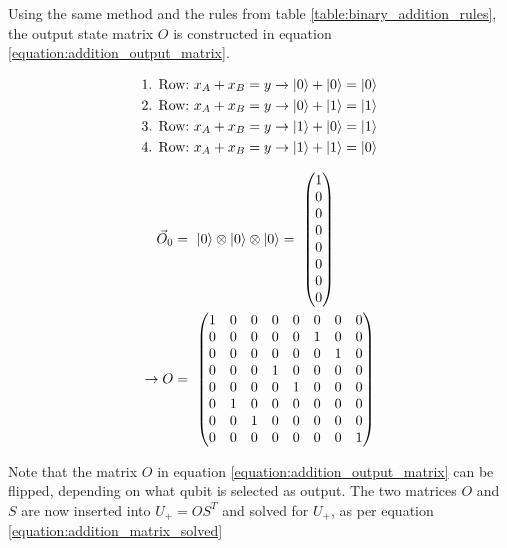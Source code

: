 Using the same method and the rules from table \ref{table:binary_addition_rules}, the output state matrix $O$ is constructed in equation \ref{equation:addition_output_matrix}.

\begin{equation}
    \begin{split}
        \text{1. Row:}\ x_{A} + x_{B} = y \rightarrow \ket{0} + \ket{0} = \ket{0}\\    
        \text{2. Row:}\ x_{A} + x_{B} = y \rightarrow \ket{0} + \ket{1} = \ket{1}\\    
        \text{3. Row:}\ x_{A} + x_{B} = y \rightarrow \ket{1} + \ket{0} = \ket{1}\\    
        \text{4. Row:}\ x_{A} + x_{B} = y \rightarrow \ket{1} + \ket{1} = \ket{0}\\    
    \end{split}
\end{equation}

\begin{equation}
\centering
    \begin{split}
        \vec{O}_0 &=\ \ket{0} \otimes \ket{0} \otimes \ket{0} =\ \begin{pmatrix}1 \\0 \\0 \\0 \\0 \\0 \\0 \\0 \end{pmatrix} \\
        \rightarrow O &=\ \begin{pmatrix}
        1 & 0 & 0 & 0 & 0 & 0 & 0 & 0\\
        0 & 0 & 0 & 0 & 0 & 1 & 0 & 0\\
        0 & 0 & 0 & 0 & 0 & 0 & 1 & 0\\
        0 & 0 & 0 & 1 & 0 & 0 & 0 & 0\\
        0 & 0 & 0 & 0 & 1 & 0 & 0 & 0\\
        0 & 1 & 0 & 0 & 0 & 0 & 0 & 0\\
        0 & 0 & 1 & 0 & 0 & 0 & 0 & 0\\
        0 & 0 & 0 & 0 & 0 & 0 & 0 & 1
        \end{pmatrix}
    \end{split}
    \label{equation:addition_output_matrix}
\end{equation}

Note that the matrix $O$ in equation \ref{equation:addition_output_matrix} can be flipped, depending on what qubit is selected as output. The two matrices $O$ and $S$ are now inserted into $U_{+} = OS^T$ and solved for $U_{+}$, as per equation \ref{equation:addition_matrix_solved}

